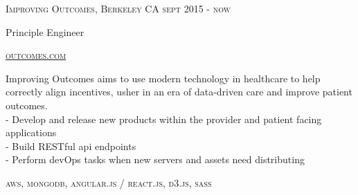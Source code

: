 {
  \textsc{\small{Improving Outcomes, Berkeley CA
    \hfill
      {\raggedleft
        sept 2015 - now
      } \\
    }
  }
  {\raggedright\large {
      Principle Engineer
  }}

  \textsc{\small\href{http://www.outcomes.com}{outcomes.com}}

  \normalsize{\raggedright
    Improving Outcomes aims to use modern technology in healthcare to help correctly align incentives, usher in an era of data-driven care and improve patient outcomes. \\
    - Develop and release new products within the provider and patient facing applications \\
    - Build RESTful api endpoints \\
    - Perform devOps tasks when new servers and assets need distributing
  }

  \textsc{\small{\color{highlight}
    aws,
    mongodb,
    angular.js / react.js,
    d3.js,
    sass
  }}
}
